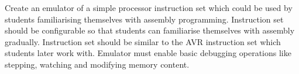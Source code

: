 Create an emulator of a simple processor instruction set which could be used by students familiarising themselves with assembly programming. Instruction set should be configurable so that students can familiarise themselves with assembly gradually. Instruction set should be similar to the AVR instruction set which students later work with. Emulator must enable basic debugging operations like stepping, watching and modifying memory content.
